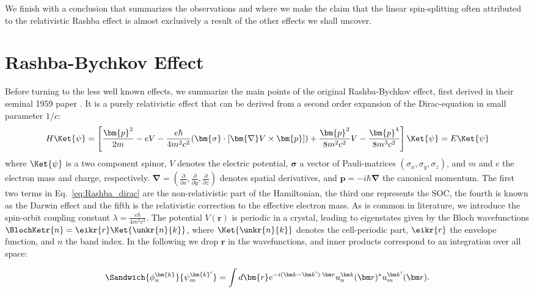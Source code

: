 We finish with a conclusion that summarizes the observations and where we make the claim that the linear spin-splitting often attributed to the relativistic Rashba effect is almost exclusively a result of the other effects we shall uncover. 

\section{Rashba-Bychkov Effect \label{sec:Rashba_relativistic}}
Before turning to the less well known effects, we summarize the main points of the original Rashba-Bychkov effect, first derived in their seminal 1959 paper \cite{Rashba1959SymmetryAr}.
It is a purely relativistic effect that can be derived from a second order expansion of the Dirac-equation in small parameter $1/c$:
\begin{equation}
	\label{eq:Rashba_dirac}
	H \Ket{\psi} = \left[\frac{\bm{p}^2}{2m} - e V - \frac{e \hbar}{4m^2c^2}(\bm{\sigma}\cdot[\bm{\nabla}V \times \bm{p}]) + \frac{\bm{p}^2}{8m^2c^2} V - \frac{\bm{p}^4}{8m^3c^2}\right]\Ket{\psi} = E\Ket{\psi}
\end{equation}
where $\Ket{\psi}$ is a two component spinor, $V$ denotes the electric potential, $\bm{\sigma}$ a vector of Pauli-matrices $(\sigma_x, \sigma_y, \sigma_z)$, and $m$ and $e$ the electron mass and charge, respectively.
$\bm \nabla = (\frac{\partial}{\partial x}, \frac{\partial}{\partial y}, \frac{\partial }{\partial z})$ denotes spatial derivatives, and $\bm{p} = -i\hbar \bm{\nabla}$ the canonical momentum.
The first two terms in Eq.~\eqref{eq:Rashba_dirac} are the non-relativistic part of the Hamiltonian, the third one represents the SOC, the fourth is known as the Darwin effect and the fifth is the relativistic correction to the effective electron mass. 
As is common in literature, we introduce the spin-orbit coupling constant $\lambda = \frac{e \hbar}{4m^2c^2}$.
The potential $V(\bm r)$ is periodic in a crystal, leading to eigenstates given by the Bloch wavefunctions $\BlochKetr{n} = \eikr{r} \Ket{\unkr{n}{k}}$, where $\Ket{\unkr{n}{k}}$ denotes the cell-periodic part, $\eikr{r}$ the envelope function, and $n$ the band index.
In the following we drop $\bm{r}$ in the wavefunctions, and inner products correspond to an integration over all space:

\begin{equation}
	\Sandwich{\phi_n^{\bm{k}}}{\psi_m^{\bm{k}'}} = \int d\bm{r} e^{-i (\bm k - \bm k') \cdot \bm r} u_n^{\bm k }(\bm r)^* u_m^{\bm k'}(\bm r).
\end{equation}

